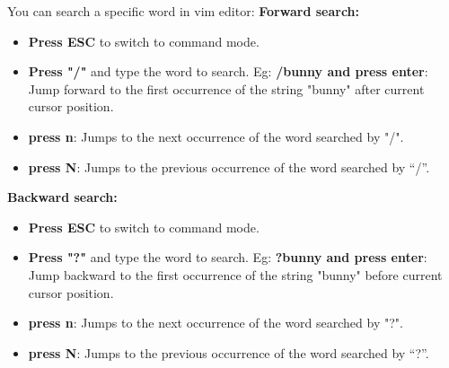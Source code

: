 
\begin{flushleft}

You can search a specific word in vim editor:
\newline
\textbf{Forward search:}
\begin{itemize}
	\item \textbf{Press ESC} to switch to command mode.
	\item \textbf{Press "/"} and type the word to search.
	\newline
	Eg: \textbf{/bunny and press enter}: Jump forward to the first occurrence of the string "bunny" after current cursor position.
	\item \textbf{press n}: Jumps to the next occurrence of the word searched by "/".
	\item \textbf{press N}: Jumps to the previous occurrence of the word searched by “/”.
\end{itemize}

\bigskip\bigskip
\textbf{Backward search:}
\begin{itemize}
	\item \textbf{Press ESC} to switch to command mode.
	\item \textbf{Press "?"} and type the word to search.
	\newline
	Eg: \textbf{?bunny and press enter}: Jump backward to the first occurrence of the string "bunny" before current cursor position.
	\item \textbf{press n}: Jumps to the next occurrence of the word searched by "?".
	\item \textbf{press N}: Jumps to the previous occurrence of the word searched by “?”.
\end{itemize}


\end{flushleft}
\newpage